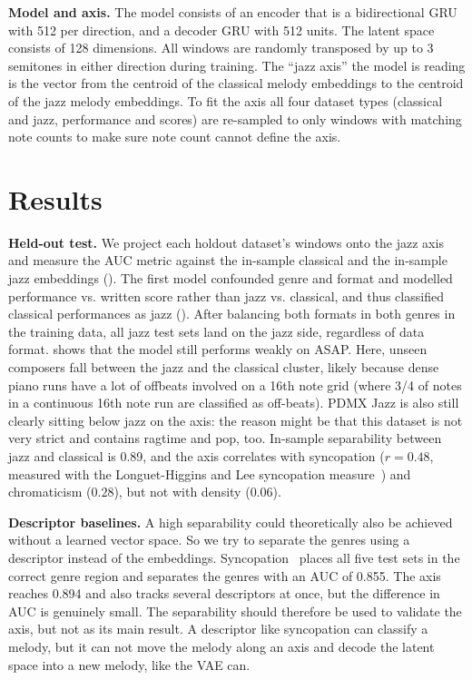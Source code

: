 \documentclass{article}
\begin{document}
\textbf{Model and axis.} The model consists of an encoder that is a bidirectional GRU 
with 512 per direction, and a decoder GRU with 512 units. The latent space consists of 128 dimensions.
All windows are randomly transposed by up to 3 semitones in either direction during training. 
The ``jazz axis'' the model is reading is the vector from the centroid of the classical melody embeddings
to the centroid of the jazz melody embeddings. To fit the axis all four dataset types
(classical and jazz, performance and scores) are re-sampled to only windows with matching note counts
to make sure note count cannot define the axis.

\section{Results}\label{sec:results}

\textbf{Held-out test.} We project each holdout dataset's windows onto the jazz
axis and measure the AUC metric against the in-sample classical and the in-sample
jazz embeddings ().
The first model confounded genre and format and modelled performance vs. written score
rather than jazz vs. classical, and thus classified classical performances as jazz (). 
After balancing both formats in both genres in the training data, all jazz test sets
land on the jazz side, regardless of data format.
 shows that the model still performs weakly on ASAP. Here, 
unseen composers fall between the jazz and the classical cluster, likely
because dense piano runs have a lot of offbeats
involved on a 16th note grid (where 3/4 of notes in a continuous 16th note run are classified as off-beats). 
PDMX Jazz is also still clearly sitting below jazz on the axis: 
the reason might be that this dataset is not very strict and contains ragtime and pop, too.
In-sample separability between jazz and classical is 0.89, and the axis correlates
with syncopation ($r=0.48$, measured with the Longuet-Higgins and Lee
syncopation measure~\cite{longuethiggins1984rhythmic}) and chromaticism
($0.28$), but not with density ($0.06$).

\textbf{Descriptor baselines.} A high separability could theoretically also be
achieved without a learned vector space. So we try to separate the genres using
a descriptor instead of the embeddings. Syncopation~\cite{longuethiggins1984rhythmic} 
places all five test sets in the correct genre region and separates the genres
with an AUC of 0.855. The axis reaches 0.894 and also tracks several descriptors at once, 
but the difference in AUC is genuinely small. The separability should therefore be used
to validate the axis, but not as its main result. A descriptor like syncopation can classify a melody, 
but it can not move the melody along an axis and decode the latent space into a new melody, like the VAE can.
\end{document}
